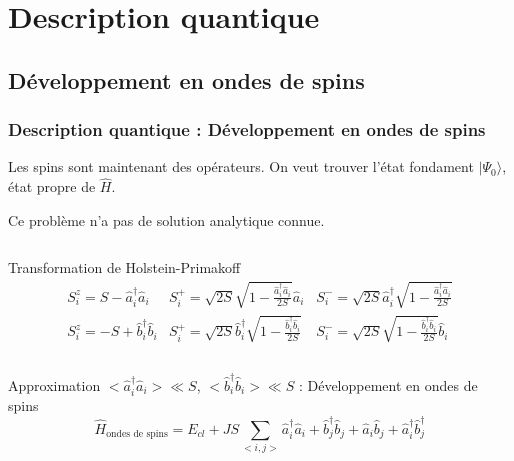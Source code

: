 \documentclass[10pt,a4paper]{beamer}
\newcommand{\an}{\hat{a}}
\newcommand{\cre}{\hat{a}^\dagger}
\newcommand{\h}{\ensuremath{\hat{H}}\xspace}
\newcommand{\ban}{\hat{b}}
\newcommand{\bcre}{\hat{b}^\dagger}
\newcommand{\fond}{\ensuremath{| \Psi_0 \rangle}\xspace}
\newcommand{\1}{\ensuremath{\ket{\om_1\bom_1}}\xspace}
\newcommand{\2}{\ensuremath{\ket{\om_2\bom_2}}\xspace}
\begin{document}
\section{Description quantique}
\subsection{Développement en ondes de spins}
\begin{frame}
\frametitle{Description quantique : Développement en ondes de spins}
Les spins sont maintenant des opérateurs. On veut trouver l'état fondament \fond, état propre de \h.

Ce problème n'a pas de solution analytique connue.

\begin{columns}[t]
  \begin{column}{12cm}
  \begin{block}{Transformation de Holstein-Primakoff}
    \begin{eqnarray}
    S_i^z=S-\cre_i\an_i &  
    S_i^+=\sqrt{2S}\sqrt{1-\frac{\cre_i\an_i}{2S}}\an_i &
    S_i^-=\sqrt{2S}\cre_i\sqrt{1-\frac{\cre_i\an_i}{2S}} \\
	S_i^z=-S+\bcre_i\ban_i & 
	S_i^+=\sqrt{2S}\bcre_i\sqrt{1-\frac{\bcre_i\ban_i}{2S}}\ &
	S_i^-=\sqrt{2S}\sqrt{1-\frac{\bcre_i\ban_i}{2S}}\ban_i
    \end{eqnarray}
  \end{block} 
  \end{column}
\end{columns}

\begin{columns}
  \begin{column}{12cm}
  \begin{alertblock}{Approximation $<\cre_i\an_i>\ll S$, $<\bcre_i\ban_i>\ll S$ : Développement en ondes de spins}
  	\begin{equation}
	\h_{\text{ondes de spins}}=E_{cl}+JS\sum_{<i,j>}\cre_i\an_i+\bcre_j\ban_j+\an_i\ban_j+\cre_i\bcre_j
	\end{equation}
  \end{alertblock}
  \end{column}
\end{columns}
\end{frame}
\end{document}
